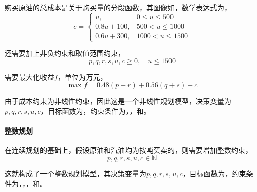 购买原油的总成本是关于购买量的分段函数，其图像如，数学表达式为，
\begin{equation}\label{eq:ex9_cons_seg}
    c = \begin{cases}
        u, & 0 \le u \le 500 \\
        0.8u + 100, & 500 < u \le 1000 \\
        0.6u + 300, & 1000 < u \le 1500
    \end{cases}
\end{equation}

还需要加上非负约束和取值范围约束，
\begin{equation}\label{eq:ex9_cons_range}
    p, q, r, s, u, c \ge 0, \quad u \le 1500
\end{equation}

需要最大化收益$f$，单位为万元，
\begin{equation}\label{eq:ex9_obj}
    \max f = 0.48(p+r) + 0.56(q+s) - c
\end{equation}

由于成本约束为非线性约束，因此这是一个非线性规划模型，决策变量为$p, q, r, s, u, c$，目标函数为，约束条件为，，和。

\paragraph{整数规划} 在连续规划的基础上，假设原油和汽油均为按吨买卖的，则需要增加整数约束，
\begin{equation}\label{eq:ex9_cons_int}
    p, q, r, s, u, c \in \mathbb{N}
\end{equation}

这就构成了一个整数规划模型，其决策变量为$p, q, r, s, u, c$，目标函数为，约束条件为，，，和。

